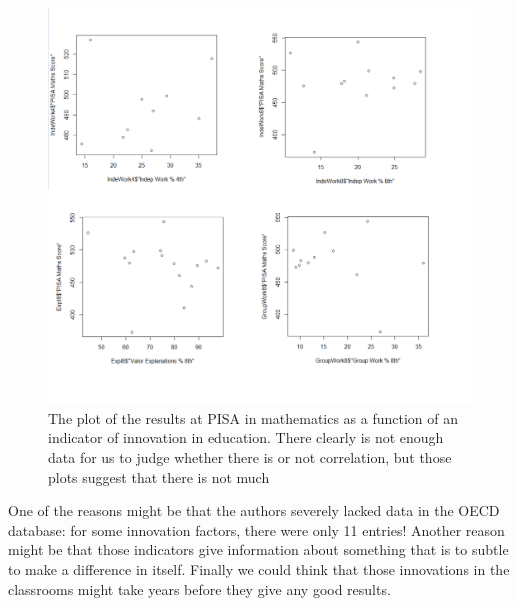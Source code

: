 \documentclass[12pt,a4paper]{article}
\begin{document}
\begin{figure}
	\centering
	\label{Innovation}
	\caption{The plot of the results at PISA in mathematics as a function of an indicator of innovation in education. There clearly is not enough data for us to judge whether there is or not correlation, but those plots suggest that there is not much}
	\includegraphics[scale=0.4]{img/Innovation.png}
\end{figure}

One of the reasons might be that the authors severely lacked data in the OECD database: for some innovation factors, there were only 11 entries!
Another reason might be that those indicators give information about something that is to subtle to make a difference in itself. Finally we could think that those innovations in the classrooms might take years before they give any good results.
\end{document}
